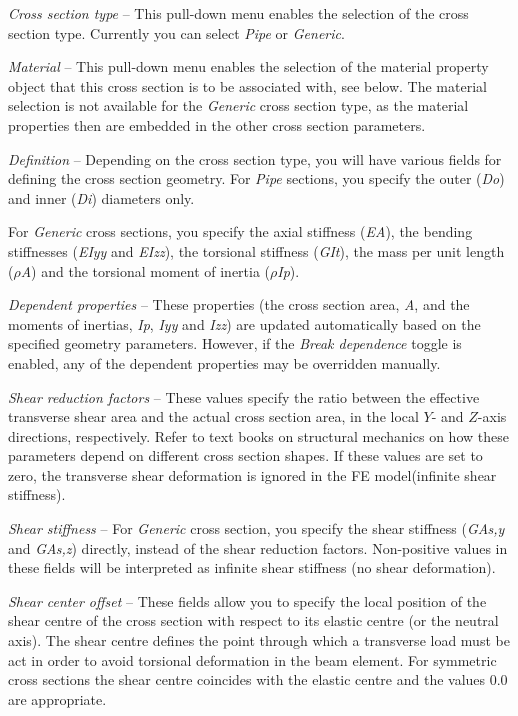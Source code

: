 \begin{bulletlist}
\item{\sl Cross section type} --
  This pull-down menu enables the selection of the cross section type.
  Currently you can select {\sl Pipe} or {\sl Generic}.

\item{\sl Material} --
  This pull-down menu enables the selection of the material property object that
  this cross section is to be associated with,
  see  below. The material selection is
  not available for the {\sl Generic} cross section type, as the material
  properties then are embedded in the other cross section parameters.

\item{\sl Definition} --
  Depending on the cross section type, you will have various fields for defining
  the cross section geometry. For {\sl Pipe} sections, you specify the outer
  ({\sl Do}) and inner ({\sl Di}) diameters only.

\item For {\sl Generic} cross sections,
  you specify the axial stiffness ({\sl EA}),
  the bending stiffnesses ({\sl EIyy} and {\sl EIzz}),
  the torsional stiffness ({\sl GIt}),
  the mass per unit length ($\rho${\sl A})
  and the torsional moment of inertia ($\rho${\sl Ip}).

\item{\sl Dependent properties} --
  These properties (the cross section area, {\sl A},
  and the moments of inertias, {\sl Ip}, {\sl Iyy} and {\sl Izz})
  are updated automatically based on the specified geometry parameters.
  However, if the {\sl Break dependence} toggle is enabled,
  any of the dependent properties may be overridden manually.

\item{\sl Shear reduction factors} --
  These values specify the ratio between the effective transverse shear area and
  the actual cross section area, in the local $Y$- and $Z$-axis directions,
  respectively. Refer to text books on structural mechanics on how these
  parameters depend on different cross section shapes.
  If these values are set to zero, the transverse shear deformation is ignored
  in the FE model(infinite shear stiffness).

\item{\sl Shear stiffness} --
  For {\sl Generic} cross section, you specify the shear stiffness ({\sl GAs,y}
  and {\sl GAs,z}) directly, instead of the shear reduction factors.
  Non-positive values in these fields will be interpreted as infinite
  shear stiffness (no shear deformation).

\item{\sl Shear center offset} --
  These fields allow you to specify the local position of the shear centre of
  the cross section with respect to its elastic centre (or the neutral axis).
  The shear centre defines the point through which a transverse load must be
  act in order to avoid torsional deformation in the beam element.
  For symmetric cross sections the shear centre coincides with the elastic
  centre and the values 0.0 are appropriate.
\end{bulletlist}


